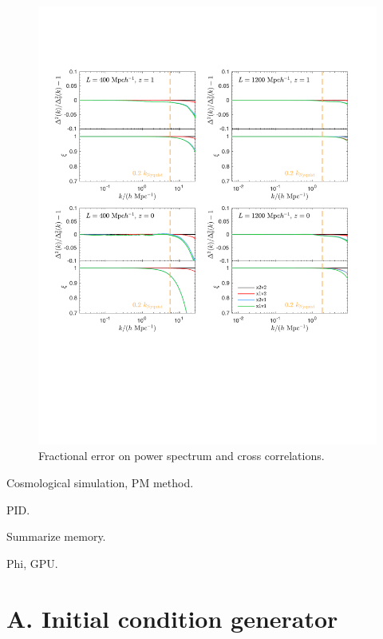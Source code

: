 \documentclass[10pt,twocolumn,preprint]{emulateapj}
\begin{document}
\begin{figure}
\centering
  \includegraphics[width=1.1\linewidth]{diff_power.pdf}
 \caption{Fractional error on power spectrum and cross correlations.}
\label{fig.ccc}
\end{figure}

 Cosmological simulation, PM method.

PID.

Summarize memory.

Phi, GPU.


\clearpage

\appendix

\section{A. Initial condition generator}


\acknowledgements



\end{document}

